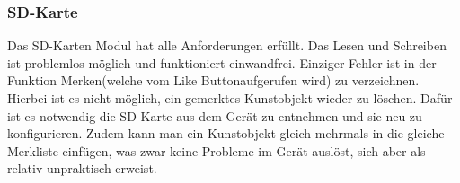 \subsubsection{SD-Karte}
Das SD-Karten Modul hat alle Anforderungen erfüllt. Das Lesen und Schreiben ist problemlos möglich und funktioniert einwandfrei. Einziger Fehler ist in der Funktion \glqq Merken\grqq (welche vom \glqq Like Button\grqq aufgerufen wird) zu verzeichnen. Hierbei ist es nicht möglich, ein gemerktes Kunstobjekt wieder zu löschen. Dafür ist es notwendig die SD-Karte aus dem Gerät zu entnehmen und sie neu zu konfigurieren. Zudem kann man ein Kunstobjekt gleich mehrmals in die gleiche {\glqq Merkliste\grqq} einfügen, was zwar keine Probleme im Gerät auslöst, sich aber als relativ unpraktisch erweist.


